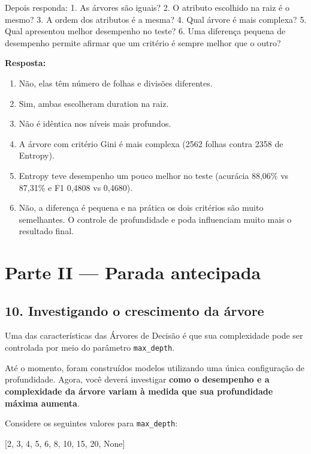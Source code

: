 \documentclass[11pt]{article}
\providecommand{\tightlist}{%
      \setlength{\itemsep}{0pt}\setlength{\parskip}{0pt}}
\newenvironment{Shaded}{}{}
\newcommand{\DecValTok}[1]{\textcolor[rgb]{0.25,0.63,0.44}{{#1}}}
\newcommand{\NormalTok}[1]{{#1}}
\newcommand{\VariableTok}[1]{\textcolor[rgb]{0.10,0.09,0.49}{{#1}}}
\begin{document}
Depois responda: 1. As árvores são iguais? 2. O atributo escolhido na
raiz é o mesmo? 3. A ordem dos atributos é a mesma? 4. Qual árvore é
mais complexa? 5. Qual apresentou melhor desempenho no teste? 6. Uma
diferença pequena de desempenho permite afirmar que um critério é sempre
melhor que o outro?

\textbf{Resposta:}

    \begin{enumerate}
\def\labelenumi{\arabic{enumi}.}
\tightlist
\item
  Não, elas têm número de folhas e divisões diferentes.
\item
  Sim, ambas escolheram duration na raiz.
\item
  Não é idêntica nos níveis mais profundos.
\item
  A árvore com critério Gini é mais complexa (2562 folhas contra 2358 de
  Entropy).
\item
  Entropy teve desempenho um pouco melhor no teste (acurácia 88,06\% vs
  87,31\% e F1 0,4808 vs 0,4680).
\item
  Não, a diferença é pequena e na prática os dois critérios são muito
  semelhantes. O controle de profundidade e poda influenciam muito mais
  o resultado final.
\end{enumerate}

    \section{Parte II --- Parada
antecipada}\label{parte-ii-parada-antecipada}

\subsection{10. Investigando o crescimento da
árvore}\label{investigando-o-crescimento-da-uxe1rvore}

Uma das características das Árvores de Decisão é que sua complexidade
pode ser controlada por meio do parâmetro \texttt{max\_depth}.

Até o momento, foram construídos modelos utilizando uma única
configuração de profundidade. Agora, você deverá investigar \textbf{como
o desempenho e a complexidade da árvore variam à medida que sua
profundidade máxima aumenta}.

Considere os seguintes valores para \texttt{max\_depth}:

\begin{Shaded}
\begin{Highlighting}[]
\NormalTok{[}\DecValTok{2}\NormalTok{, }\DecValTok{3}\NormalTok{, }\DecValTok{4}\NormalTok{, }\DecValTok{5}\NormalTok{, }\DecValTok{6}\NormalTok{, }\DecValTok{8}\NormalTok{, }\DecValTok{10}\NormalTok{, }\DecValTok{15}\NormalTok{, }\DecValTok{20}\NormalTok{, }\VariableTok{None}\NormalTok{]}
\end{Highlighting}
\end{Shaded}
\end{document}
